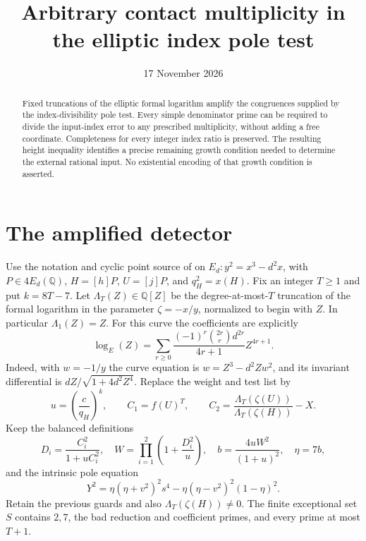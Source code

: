 \documentclass[11pt,a4paper]{article}
\title{Arbitrary contact multiplicity in the elliptic index pole test}
\author{}\date{17 November 2026}
\newcommand{\Q}{\mathbb Q}\newcommand{\Z}{\mathbb Z}
\begin{document}
\maketitle

\begin{abstract}
Fixed truncations of the elliptic formal logarithm amplify the
congruences supplied by the index-divisibility pole test. Every
simple denominator prime can be required to divide the input-index
error to any prescribed multiplicity, without adding a free
coordinate. Completeness for every integer index ratio is preserved.
The resulting height inequality identifies a precise remaining
growth condition needed to determine the external rational input.
No existential encoding of that growth condition is asserted.
\end{abstract}

\section{The amplified detector}

Use the notation and cyclic point source of \cite{Index} on
$E_d:y^2=x^3-d^2x$, with $P\in4E_d(\Q)$,
$H=[h]P$, $U=[j]P$, and $q_H^2=x(H)$.
Fix an integer $T\ge1$ and put $k=8T-7$.
Let $\Lambda_T(Z)\in\Q[Z]$ be the degree-at-most-$T$ truncation
of the formal logarithm in the parameter $\zeta=-x/y$, normalized
to begin with $Z$. In particular $\Lambda_1(Z)=Z$.
For this curve the coefficients are explicitly
\[
 \log_E(Z)=\sum_{r\ge0}
      \frac{(-1)^r\binom{2r}{r}d^{2r}}{4r+1}Z^{4r+1}.
\]
Indeed, with $w=-1/y$ the curve equation is
$w=Z^3-d^2Zw^2$, and its invariant differential is
$dZ/\sqrt{1+4d^2Z^4}$.
Replace the weight and test list by
\[
 u=\left(\frac c{q_H}\right)^k,\qquad
 C_1=f(U)^T,\qquad
 C_2=\frac{\Lambda_T(\zeta(U))}{\Lambda_T(\zeta(H))}-X.
\]
Keep the balanced definitions
\[
 D_i=\frac{C_i^2}{1+uC_i^2},\quad
 W=\prod_{i=1}^2\left(1+\frac{D_i^2}{u}\right),\quad
 b=\frac{4uW^2}{(1+u)^2},\quad\eta=7b,
\]
and the intrinsic pole equation
\[
 Y^2=\eta(\eta+v^2)^2s^4
              -\eta(\eta-v^2)^2(1-\eta)^2.
\]
Retain the previous guards and also
$\Lambda_T(\zeta(H))\ne0$. The finite exceptional set $S$
contains $2,7$, the bad reduction and coefficient primes, and
every prime at most $T+1$.
\end{document}
